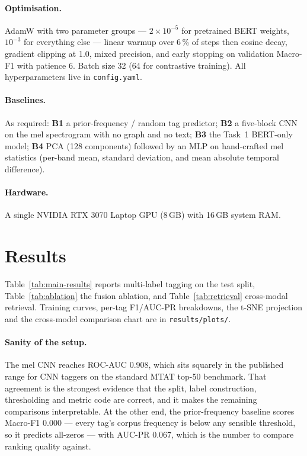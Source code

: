 \documentclass{article}
\begin{document}
\paragraph{Optimisation.} AdamW with two parameter groups --- $2\times10^{-5}$
for pretrained BERT weights, $10^{-3}$ for everything else --- linear warmup over
6\,\% of steps then cosine decay, gradient clipping at 1.0, mixed precision, and
early stopping on validation Macro-F1 with patience 6. Batch size 32 (64 for
contrastive training). All hyperparameters live in \texttt{config.yaml}.

\paragraph{Baselines.} As required: \textbf{B1} a prior-frequency / random tag
predictor; \textbf{B2} a five-block CNN on the mel spectrogram with no graph and
no text; \textbf{B3} the Task~1 BERT-only model; \textbf{B4} PCA (128 components)
followed by an MLP on hand-crafted mel statistics (per-band mean, standard
deviation, and mean absolute temporal difference).

\paragraph{Hardware.} A single NVIDIA RTX 3070 Laptop GPU (8\,GB) with 16\,GB
system RAM.

\section{Results}
\label{sec:results}



Table~\ref{tab:main-results} reports multi-label tagging on the test split,
Table~\ref{tab:ablation} the fusion ablation, and Table~\ref{tab:retrieval}
cross-modal retrieval. Training curves, per-tag F1/AUC-PR breakdowns, the t-SNE
projection and the cross-model comparison chart are in
\texttt{results/plots/}.

\paragraph{Sanity of the setup.} The mel CNN reaches ROC-AUC 0.908, which sits
squarely in the published range for CNN taggers on the standard MTAT top-50
benchmark. That agreement is the strongest evidence that the split, label
construction, thresholding and metric code are correct, and it makes the
remaining comparisons interpretable. At the other end, the prior-frequency
baseline scores Macro-F1 0.000 --- every tag's corpus frequency is below any
sensible threshold, so it predicts all-zeros --- with AUC-PR 0.067, which is the
number to compare ranking quality against.
\end{document}
